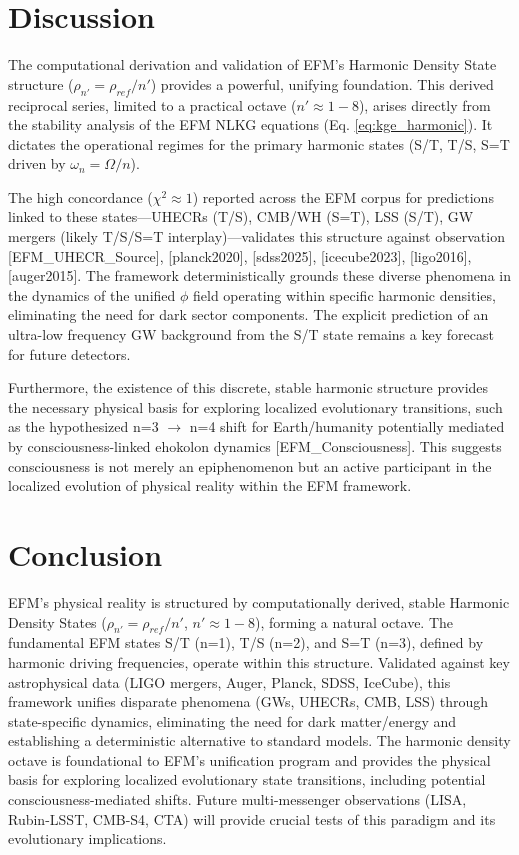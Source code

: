 \documentclass[11pt]{article}
\begin{document}
\section{Discussion}
The computational derivation and validation of EFM’s Harmonic Density State structure (\(\rho_{n'} = \rho_{ref}/n'\)) provides a powerful, unifying foundation. This derived reciprocal series, limited to a practical octave (\(n' \approx 1-8\)), arises directly from the stability analysis of the EFM NLKG equations (Eq. \ref{eq:kge_harmonic}). It dictates the operational regimes for the primary harmonic states (S/T, T/S, S=T driven by \(\omega_n=\Omega/n\)).

The high concordance (\(\chi^2 \approx 1\)) reported across the EFM corpus for predictions linked to these states—UHECRs (T/S), CMB/WH (S=T), LSS (S/T), GW mergers (likely T/S/S=T interplay)—validates this structure against observation [EFM\_UHECR\_Source], [planck2020], [sdss2025], [icecube2023], [ligo2016], [auger2015]. The framework deterministically grounds these diverse phenomena in the dynamics of the unified \(\phi\) field operating within specific harmonic densities, eliminating the need for dark sector components. The explicit prediction of an ultra-low frequency GW background from the S/T state remains a key forecast for future detectors.

Furthermore, the existence of this discrete, stable harmonic structure provides the necessary physical basis for exploring localized evolutionary transitions, such as the hypothesized n=3 \(\to\) n=4 shift for Earth/humanity potentially mediated by consciousness-linked ehokolon dynamics [EFM\_Consciousness]. This suggests consciousness is not merely an epiphenomenon but an active participant in the localized evolution of physical reality within the EFM framework.

\section{Conclusion}
EFM’s physical reality is structured by computationally derived, stable Harmonic Density States (\(\rho_{n'} = \rho_{ref}/n'\), \(n' \approx 1-8\)), forming a natural octave. The fundamental EFM states S/T (n=1), T/S (n=2), and S=T (n=3), defined by harmonic driving frequencies, operate within this structure. Validated against key astrophysical data (LIGO mergers, Auger, Planck, SDSS, IceCube), this framework unifies disparate phenomena (GWs, UHECRs, CMB, LSS) through state-specific dynamics, eliminating the need for dark matter/energy and establishing a deterministic alternative to standard models. The harmonic density octave is foundational to EFM's unification program and provides the physical basis for exploring localized evolutionary state transitions, including potential consciousness-mediated shifts. Future multi-messenger observations (LISA, Rubin-LSST, CMB-S4, CTA) will provide crucial tests of this paradigm and its evolutionary implications.
\end{document}
